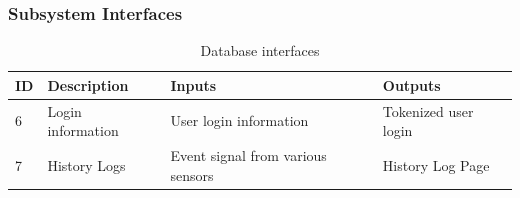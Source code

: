 \subsubsection{Subsystem Interfaces}

\begin {table}[H]
\caption {Database interfaces} 
\begin{center}
    \begin{tabular}{ | p{1cm} | p{6cm} | p{3cm} | p{3cm} |}
    \hline
    ID & Description & Inputs & Outputs \\ \hline
    6 & Login information & User login information & Tokenized user login \\ \hline
    7 & History Logs & Event signal from various sensors & History Log Page \\ \hline
    \end{tabular}
\end{center}
\end{table}